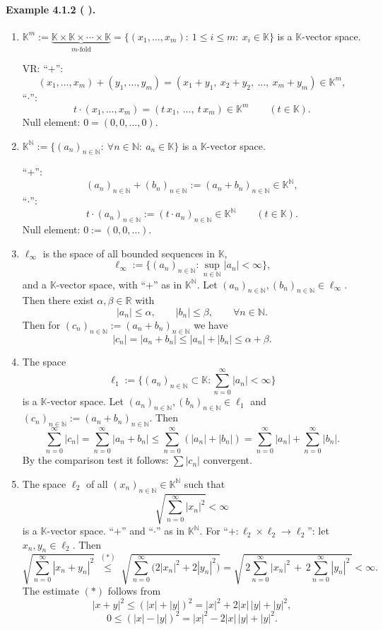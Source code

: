 \documentclass[12pt,a4paper]{article}
\newcommand{\N}{\mathbb{N}}
\newcommand{\R}{\mathbb{R}}
\newcommand{\K}{\mathbb{K}} %
\newcommand{\NumberedExample}[3]{%
\paragraph*{Example #1 ( #2 ).} #3\par}
\theoremstyle{plain}
\theoremstyle{definition}
\theoremstyle{remark}
\begin{document}
\NumberedExample{4.1.2}{}{
\begin{enumerate}[label={(\arabic*)}, leftmargin=*]
	\item $\displaystyle \K^m := \underbrace{\K\times\K\times\cdots\times\K}_{m\text{-fold}} = \{(x_1,\dots,x_m):\ 1\le i\le m:\ x_i\in\K\}$ is a $\K$-vector space.

	VR: \quad “$+$”:
	\[
		(x_1,\dots,x_m) + (y_1,\dots,y_m) = (x_1+y_1,\ x_2+y_2,\ \dots,\ x_m+y_m) \in \K^m,
	\]
	“$\cdot$”:
	\[
		t\cdot(x_1,\dots,x_m) = (t\,x_1,\ \dots,\ t\,x_m) \in \K^m \qquad (t\in\K).
	\]
	Null element: $0=(0,0,\dots,0)$.

	\item $\displaystyle \K^{\N} := \{(a_n)_{n\in\N}:\ \forall n\in\N:\ a_n\in\K\}$ is a $\K$-vector space.

	“$+$”:
	\[
		(a_n)_{n\in\N} + (b_n)_{n\in\N} := (a_n+b_n)_{n\in\N} \in \K^{\N},
	\]
	“$\cdot$”:
	\[
		t\cdot(a_n)_{n\in\N} := (t\cdot a_n)_{n\in\N} \in \K^{\N} \qquad (t\in\K).
	\]
	Null element: $0 := (0,0,\dots)$.

	\item $\ell_\infty$ is the space of all bounded sequences in $\K$,
	\[
		\ell_\infty := \{ (a_n)_{n\in\N} : \sup_{n\in\N} |a_n| < \infty \},
	\]
	and a $\K$-vector space, with “$+$” as in $\K^{\N}$. Let $(a_n)_{n\in\N}, (b_n)_{n\in\N}\in \ell_\infty$. Then there exist $\alpha,\beta\in\R$ with
	\[
		|a_n| \le \alpha,\qquad |b_n| \le \beta, \qquad \forall n\in\N.
	\]
	Then for $(c_n)_{n\in\N} := (a_n+b_n)_{n\in\N}$ we have
	\[
		|c_n| = |a_n+b_n| \le |a_n| + |b_n| \le \alpha + \beta.
	\]

	\item The space
	\[
		\ell_1 := \{ (a_n)_{n\in\N} \subset \K : \sum_{n=0}^{\infty} |a_n| < \infty \}
	\]
	is a $\K$-vector space. Let $(a_n)_{n\in\N}, (b_n)_{n\in\N}\in \ell_1$ and $(c_n)_{n\in\N} := (a_n+b_n)_{n\in\N}$. Then
	\[
		\sum_{n=0}^{\infty} |c_n| = \sum_{n=0}^{\infty} |a_n+b_n| \le \sum_{n=0}^{\infty} (|a_n|+|b_n|) = \sum_{n=0}^{\infty} |a_n| + \sum_{n=0}^{\infty} |b_n|.
	\]
	By the comparison test it follows: $\sum |c_n|$ convergent.

	\item The space $\ell_2$ of all $(x_n)_{n\in\N}\in \K^{\N}$ such that
	\[
		\sqrt{\sum_{n=0}^{\infty} |x_n|^2} < \infty
	\]
	is a $\K$-vector space. “$+$” and “$\cdot$” as in $\K^{\N}$. For “$+\colon \ell_2\times\ell_2\to\ell_2$”: let $x_n, y_n\in \ell_2$. Then
	\[
		\sqrt{\sum_{n=0}^{\infty} |x_n+y_n|^2}
		\;\overset{(*)}{\le}\;
		\sqrt{\sum_{n=0}^{\infty} \big(2|x_n|^2 + 2|y_n|^2\big)}
		= \sqrt{\,2\sum_{n=0}^{\infty} |x_n|^2\, + \,2\sum_{n=0}^{\infty} |y_n|^2\,} 
		< \infty.
	\]
	The estimate $(*)$ follows from
	\[
		|x+y|^2 \le (|x|+|y|)^2 = |x|^2 + 2|x|\,|y| + |y|^2,
	\]
	\[
		0 \le (|x|-|y|)^2 = |x|^2 - 2|x|\,|y| + |y|^2.
	\]
\end{enumerate}}
\end{document}
